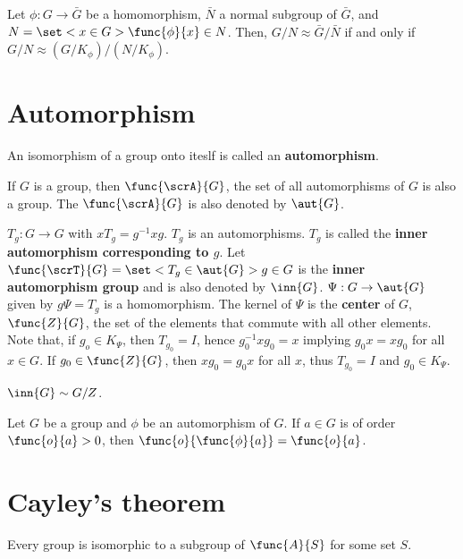 \begin{theorem}
    Let \(\phi:G \to \bar{G}\) be a homomorphism, \(\bar{N}\) a normal subgroup of \(\bar{G}\), and \(N = \set<x \in G>{\func{\phi}{x} \in N}\). Then, \(G/N \approx \bar{G}/\bar{N}\) if and only if \(G/N \approx (G/K_{\phi})/(N/K_{\phi})\).
\end{theorem}

\section{Automorphism}
\begin{definition}
    An isomorphism of a group onto iteslf is called an \textbf{automorphism}.
\end{definition}

\begin{lemma}
    If \(G\) is a group, then \(\func{\scrA}{G}\), the set of all automorphisms of \(G\) is also a group. The \(\func{\scrA}{G}\) is also denoted by \(\aut{G}\).
\end{lemma}

\begin{example}
\(T_g:G \to G\) with \(xT_g = g^{-1}xg\). \(T_g\) is an automorphisms. \(T_g\) is called the \textbf{inner automorphism corresponding to \(g\)}. Let \(\func{\scrT}{G} = \set<T_g \in \aut{G}>{g \in G}\) is the \textbf{inner automorphism group} and is also denoted by \(\inn{G}\). \(\Psi: G \to \aut{G}\) given by \(g\Psi = T_g\) is a homomorphism. The kernel of \(\Psi\) is the \textbf{center} of \(G\), \(\func{Z}{G}\), the set of the elements that commute with all other elements. Note that, if \(g_o \in K_{\Psi}\), then \(T_{g_0} = I\), hence \(g_0^{-1}xg_0 = x\) implying \(g_0x = xg_0\) for all \(x \in G\). If \(g_0 \in \func{Z}{G}\), then \(xg_0 = g_0x\) for all \(x\), thus \(T_{g_0} = I\) and \(g_0 \in K_{\Psi}\).
\end{example}

\begin{lemma}
    \(\inn{G} \sim G/Z\).
\end{lemma}

\begin{lemma}
    Let \(G\) be a group and \(\phi\) be an automorphism of \(G\). If \(a \in G\) is of order \(\func{o}{a} > 0\), then \(\func{o}{\func{\phi}{a}} = \func{o}{a}\).
\end{lemma}

\section{Cayley's theorem}
\begin{theorem}[Cayley]
    Every group is isomorphic to a subgroup of \(\func{A}{S}\) for some set \(S\).
\end{theorem}

